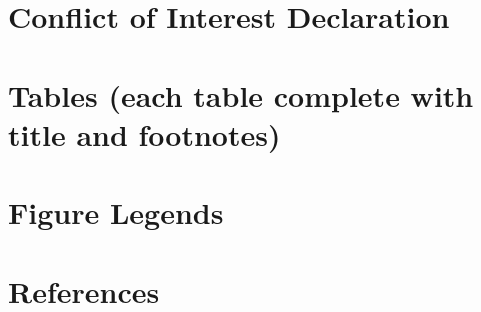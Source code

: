 \documentclass[
  12pt,
  a4paper,
]{article}
\begin{document}
\hypertarget{conflict-of-interest-declaration}{%
\section{Conflict of Interest
Declaration}\label{conflict-of-interest-declaration}}

\hypertarget{tables-each-table-complete-with-title-and-footnotes}{%
\section{Tables (each table complete with title and
footnotes)}\label{tables-each-table-complete-with-title-and-footnotes}}

\hypertarget{figure-legends}{%
\section{Figure Legends}\label{figure-legends}}

\hypertarget{references}{%
\section*{References}\label{references}}
\end{document}
